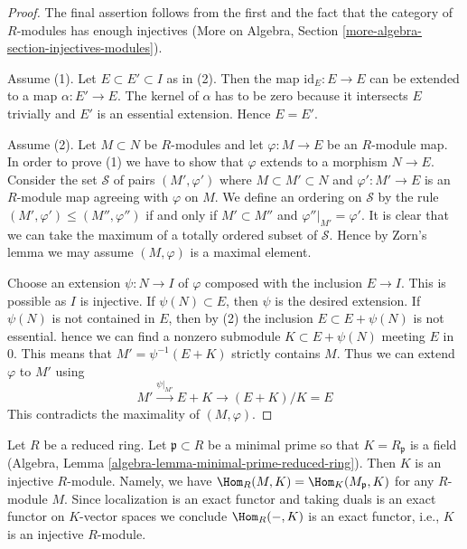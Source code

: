 \begin{proof}
The final assertion follows from the first and the fact that the
category of $R$-modules has enough injectives
(More on Algebra, Section \ref{more-algebra-section-injectives-modules}).

\medskip\noindent
Assume (1). Let $E \subset E' \subset I$ as in (2).
Then the map $\text{id}_E : E \to E$ can be extended
to a map $\alpha : E' \to E$. The kernel of $\alpha$ has to be
zero because it intersects $E$ trivially and $E'$ is an essential
extension. Hence $E = E'$.

\medskip\noindent
Assume (2). Let $M \subset N$ be $R$-modules and let $\varphi : M \to E$
be an $R$-module map. In order to prove (1) we have to show that
$\varphi$ extends to a morphism $N \to E$. Consider the set $\mathcal{S}$
of pairs
$(M', \varphi')$ where $M \subset M' \subset N$ and $\varphi' : M' \to E$
is an $R$-module map agreeing with $\varphi$ on $M$. We define an ordering
on $\mathcal{S}$ by the rule $(M', \varphi') \leq (M'', \varphi'')$
if and only if $M' \subset M''$ and $\varphi''|_{M'} = \varphi'$.
It is clear that we can take the maximum of a totally ordered subset
of $\mathcal{S}$. Hence by Zorn's lemma we may assume $(M, \varphi)$
is a maximal element.

\medskip\noindent
Choose an extension $\psi : N \to I$ of $\varphi$ composed
with the inclusion $E \to I$. This is possible as $I$ is injective.
If $\psi(N) \subset E$, then $\psi$ is the desired extension.
If $\psi(N)$ is not contained in $E$, then by (2) the inclusion
$E \subset E + \psi(N)$ is not essential. hence
we can find a nonzero submodule $K \subset E + \psi(N)$ meeting $E$ in $0$.
This means that $M' = \psi^{-1}(E + K)$ strictly contains $M$.
Thus we can extend $\varphi$ to $M'$ using
$$
M' \xrightarrow{\psi|_{M'}} E + K \to (E + K)/K = E
$$
This contradicts the maximality of $(M, \varphi)$.
\end{proof}

\begin{example}
\label{example-reduced-ring-injective}
Let $R$ be a reduced ring. Let $\mathfrak p \subset R$ be a minimal prime
so that $K = R_\mathfrak p$ is a field
(Algebra, Lemma \ref{algebra-lemma-minimal-prime-reduced-ring}).
Then $K$ is an injective $R$-module. Namely, we have
$\Hom_R(M, K) = \Hom_K(M_\mathfrak p, K)$ for any $R$-module
$M$. Since localization is an exact functor and taking duals is
an exact functor on $K$-vector spaces we conclude $\Hom_R(-, K)$
is an exact functor, i.e., $K$ is an injective $R$-module.
\end{example}

